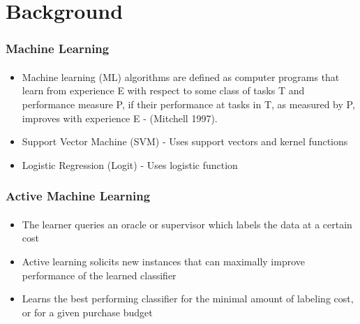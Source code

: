 \documentclass{beamer}
\begin{document}
\section{Background}
\begin{frame}
    \frametitle{Machine Learning}
    \framesubtitle{}
\begin{itemize}
  \item Machine learning (ML) algorithms are defined as computer programs that learn from experience E
with respect to some class of tasks T and performance measure P, if their performance at
tasks in T, as measured by P, improves with experience E - (Mitchell 1997).
  \item Support Vector Machine (SVM) - Uses support vectors and kernel functions %
  \item Logistic Regression (Logit) - Uses logistic function %
\end{itemize}
\end{frame}
\begin{frame}
    \frametitle{Active Machine Learning}
    \framesubtitle{}
\begin{itemize}
  \item The learner queries an oracle or supervisor which labels the data at a certain cost
  \item Active learning solicits new instances that can maximally improve performance of the learned classifier
  \item Learns the best performing classifier for the minimal amount of labeling cost,
  or for a given purchase budget
\end{itemize}
\end{frame}
\end{document}
